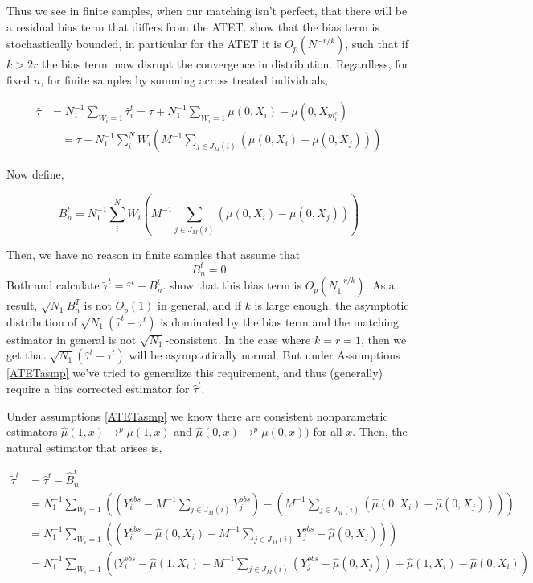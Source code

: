 \documentclass{article}
\newcommand{\ta}{\tau^{t}}
\newcommand{\hta}{\hat \tau^{t}}
\begin{document}
Thus we see in finite samples, when our matching isn't perfect, that there will be a residual bias term that differs from the ATET. \cite{AnI:06} show that the bias term is stochastically bounded, in particular for the ATET it is $O_{p}(N^{-r/k})$, such that if $k > 2r$ the bias term maw disrupt the convergence in distribution. Regardless, for fixed $n$, for finite samples by summing across treated individuals,

\begin{align*} \hat \tau &= N_{1}^{-1}\sum_{W_{i} = 1}\hat \tau_{i}^{t} =\tau+N_{1}^{-1}\sum_{W_{i} = 1}\mu(0,X_{i}) -\mu(0,X_{m_{i}^{c}}) \\
&\quad= \tau+N_{1}^{-1}\sum_{i}^{N}W_{i}\left(M^{-1}\sum_{j \in J_{M}(i)}(\mu(0,X_{i}) - \mu(0,X_{j}))\right)
\end{align*}

Now define, 

$$B_{n}^{t} = N_{1}^{-1}\sum_{i}^{N}W_{i}\left(M^{-1}\sum_{j \in J_{M}(i)}(\mu(0,X_{i}) - \mu(0,X_{j}))\right)$$

Then, we have no reason in finite samples that assume that 
$$B_{n}^{t}=0$$
Both \cite{OnR:16} and \cite{AnI:06} calculate $\tilde{\tau}^{t} = \hat \tau^{t}-B_{n}^{t}$. \cite{AnI:06} show that this bias term is $O_{p}(N_{1}^{-r/k})$. As a result, $\sqrt{N_{1}}B_{n}^{T}$ is not $O_{p}(1)$ in general, and if $k$ is large enough, the asymptotic distribution of $\sqrt{N_{1}}(\hta-\ta)$ is dominated by the bias term and the matching estimator in general is not $\sqrt{N_{1}}$-consistent. In the case where $k = r = 1$, then we get that $\sqrt{N_{1}}(\hta -\ta)$ will be asymptotically normal. But under Assumptions \ref{ATETasmp} we've tried to generalize this requirement, and thus (generally) require a bias corrected estimator for $\hta$. 

Under assumptions \ref{ATETasmp} we know there are consistent nonparametric estimators $\hat \mu(1,x) \to^{p} \mu(1,x)$ and $\hat \mu(0,x) \to^{p} \mu(0,x))$ for all $x$. Then, the natural estimator that arises is,

\begin{align*}\tilde \tau^{t} &= \hat\tau^{t}-\hat B_{n}^{t} \\
&= N_{1}^{-1}\sum_{W_{i} = 1}\left((Y_{i}^{obs} -M^{-1}\sum_{j \in J_{M}(i)}Y_{j}^{obs})-\left(M^{-1}\sum_{j \in J_{M}(i)}(\hat \mu(0,X_{i}) - \hat \mu(0,X_{j}))\right)\right) \\
&= N_{1}^{-1}\sum_{W_{i} = 1}\left((Y_{i}^{obs}-\hat \mu(0,X_{i}) -M^{-1}\sum_{j \in J_{M}(i)}Y_{j}^{obs}-\hat \mu(0,X_{j}))\right) \\
&= N_{1}^{-1}\sum_{W_{i} = 1}\left((Y_{i}^{obs}-\hat \mu(1,X_{i}) -M^{-1}\sum_{j \in J_{M}(i)}(Y_{j}^{obs}-\hat \mu(0,X_{j}))+\hat \mu(1,X_{i})-\hat \mu(0,X_{i})\right)
\end{align*}
\end{document}
